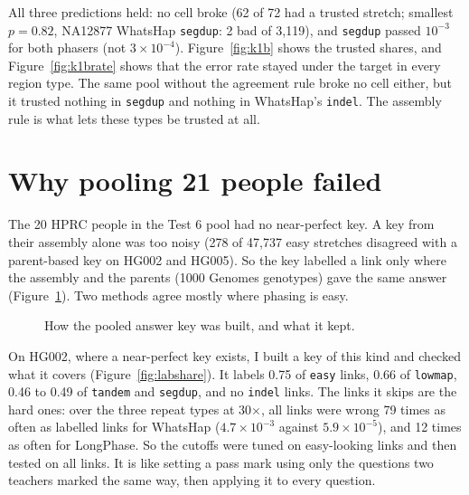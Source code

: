 \documentclass[11pt]{article}
\newcommand{\grp}[1]{\texttt{#1}}
\begin{document}
All three predictions held: no cell broke (62 of 72 had a trusted
stretch; smallest $p=0.82$, NA12877 WhatsHap \grp{segdup}: 2 bad of 3{,}119),
and \grp{segdup} passed $10^{-3}$ for both phasers (not $3\times10^{-4}$).
Figure~\ref{fig:k1b} shows the trusted shares, and Figure~\ref{fig:k1brate}
shows that the error rate stayed under the target in every region type. The
same pool without the agreement rule broke no cell either, but it trusted
nothing in \grp{segdup} and nothing in WhatsHap's \grp{indel}. The assembly
rule is what lets these types be trusted at all.

\section{Why pooling 21 people failed}\label{sec:keys}

The 20 HPRC people in the Test 6 pool had no near-perfect key. A key from
their assembly alone was too noisy (278 of 47{,}737 easy stretches disagreed
with a parent-based key on HG002 and HG005). So the key labelled a link only
where the assembly and the parents (1000 Genomes genotypes) gave the same
answer (Figure~\ref{fig:key}). Two methods agree mostly where phasing is
easy.

\begin{figure}[h]
\centering
{}
\caption{How the pooled answer key was built, and what it kept.}
\label{fig:key}
\end{figure}

On HG002, where a near-perfect key exists, I built a key of this kind and
checked what it covers (Figure~\ref{fig:labshare}). It labels 0.75 of
\grp{easy} links, 0.66 of \grp{lowmap}, 0.46 to 0.49 of \grp{tandem} and
\grp{segdup}, and no \grp{indel} links. The links it skips are the hard
ones: over the three
repeat types at 30$\times$, all links were wrong 79 times as often as
labelled links for WhatsHap ($4.7\times10^{-3}$ against $5.9\times10^{-5}$),
and 12 times as often for LongPhase. So the cutoffs were tuned on
easy-looking links and then tested on all links. It is like setting a pass
mark using only the questions two teachers marked the same way, then
applying it to every question.
\end{document}
